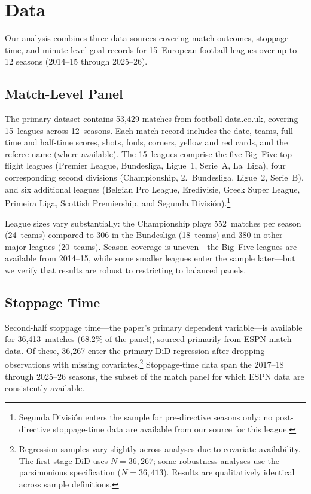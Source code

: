 
\section{Data}
\label{sec:data}

Our analysis combines three data sources covering match outcomes,
stoppage time, and minute-level goal records for 15~European football
leagues over up to 12 seasons (2014--15 through 2025--26).

\subsection{Match-Level Panel}

The primary dataset contains 53,429 matches from
football-data.co.uk, covering 15~leagues across 12~seasons. Each
match record includes the date, teams, full-time and half-time
scores, shots, fouls, corners, yellow and red cards, and the referee
name (where available). The 15~leagues comprise the five Big~Five
top-flight leagues (Premier League, Bundesliga, Ligue~1, Serie~A,
La~Liga), four corresponding second divisions (Championship,
2.~Bundesliga, Ligue~2, Serie~B), and six additional leagues
(Belgian Pro League, Eredivisie, Greek Super League, Primeira Liga,
Scottish Premiership, and Segunda Divisi\'{o}n).\footnote{Segunda
Divisi\'{o}n enters the sample for pre-directive seasons only; no
post-directive stoppage-time data are available from our source for
this league.}

League sizes vary substantially: the Championship plays 552~matches
per season (24~teams) compared to 306 in the Bundesliga (18~teams)
and 380 in other major leagues (20~teams). Season coverage is
uneven---the Big~Five leagues are available from 2014--15, while some
smaller leagues enter the sample later---but we verify that results
are robust to restricting to balanced panels.

\subsection{Stoppage Time}

Second-half stoppage time---the paper's primary dependent
variable---is available for 36,413~matches (68.2\% of the panel),
sourced primarily from ESPN match data. Of these, 36,267 enter the
primary DiD regression after dropping observations with missing
covariates.\footnote{Regression samples vary slightly across
analyses due to covariate availability. The first-stage DiD uses
$N = 36{,}267$; some robustness analyses use the parsimonious
specification ($N = 36{,}413$). Results are qualitatively identical
across sample definitions.} Stoppage-time data span the 2017--18
through 2025--26 seasons, the subset of the match panel for which
ESPN data are consistently available.

